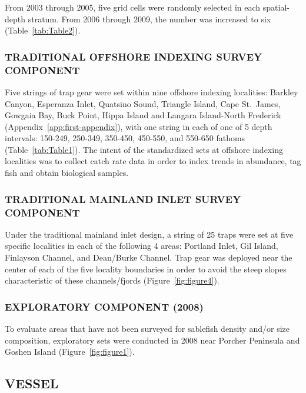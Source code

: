 \documentclass[12pt]{article}\usepackage[]{graphicx}\usepackage[]{color}
\begin{document}
From 2003 through 2005, five grid cells were randomly selected in each spatial-depth stratum. From 2006 through 2009, the number was increased to six (Table~\ref{tab:Table2}).

\hypertarget{traditional-offshore-indexing-survey-component}{%
\subsubsection{TRADITIONAL OFFSHORE INDEXING SURVEY COMPONENT}\label{traditional-offshore-indexing-survey-component}}

Five strings of trap gear were set within nine offshore indexing localities: Barkley Canyon, Esperanza Inlet, Quatsino Sound, Triangle Island, Cape St.~James, Gowgaia Bay, Buck Point, Hippa Island and Langara Island-North Frederick (Appendix~\ref{app:first-appendix}), with one string in each of one of 5 depth intervals: 150-249, 250-349, 350-450, 450-550, and 550-650 fathoms (Table~\ref{tab:Table1}). The intent of the standardized sets at offshore indexing localities was to collect catch rate data in order to index trends in abundance, tag fish and obtain biological samples.

\hypertarget{traditional-mainland-inlet-survey-component}{%
\subsubsection{TRADITIONAL MAINLAND INLET SURVEY COMPONENT}\label{traditional-mainland-inlet-survey-component}}

Under the traditional mainland inlet design, a string of 25 traps were set at five specific localities in each of the following 4 areas: Portland Inlet, Gil Island, Finlayson Channel, and Dean/Burke Channel. Trap gear was deployed near the center of each of the five locality boundaries in order to avoid the steep slopes characteristic of these channels/fjords (Figure~\ref{fig:figure4}).

\hypertarget{exploratory-component-2008}{%
\subsubsection{EXPLORATORY COMPONENT (2008)}\label{exploratory-component-2008}}

To evaluate areas that have not been surveyed for sablefish density and/or size composition, exploratory sets were conducted in 2008 near Porcher Peninsula and Goshen Island (Figure~\ref{fig:figure1}).

\hypertarget{vessel}{%
\subsection{VESSEL}\label{vessel}}
\end{document}
